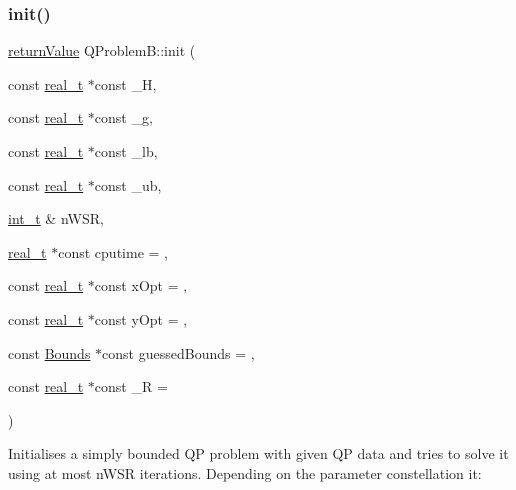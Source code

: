 \subsubsection{\texorpdfstring{init()}{init()}\hspace{0.1cm}{\footnotesize\ttfamily [2/3]}}
{\footnotesize\ttfamily \hyperlink{_message_handling_8hpp_a81d556f613bfbabd0b1f9488c0fa865e}{return\+Value} Q\+Problem\+B\+::init (\begin{DoxyParamCaption}\item[{const \hyperlink{qp_o_a_s_e_s__wrapper_8h_a0d00e2b3dfadee81331bbb39068570c4}{real\+\_\+t} $\ast$const}]{\+\_\+H,  }\item[{const \hyperlink{qp_o_a_s_e_s__wrapper_8h_a0d00e2b3dfadee81331bbb39068570c4}{real\+\_\+t} $\ast$const}]{\+\_\+g,  }\item[{const \hyperlink{qp_o_a_s_e_s__wrapper_8h_a0d00e2b3dfadee81331bbb39068570c4}{real\+\_\+t} $\ast$const}]{\+\_\+lb,  }\item[{const \hyperlink{qp_o_a_s_e_s__wrapper_8h_a0d00e2b3dfadee81331bbb39068570c4}{real\+\_\+t} $\ast$const}]{\+\_\+ub,  }\item[{\hyperlink{_types_8hpp_ab6fd6105e64ed14a0c9281326f05e623}{int\+\_\+t} \&}]{n\+W\+SR,  }\item[{\hyperlink{qp_o_a_s_e_s__wrapper_8h_a0d00e2b3dfadee81331bbb39068570c4}{real\+\_\+t} $\ast$const}]{cputime = {},  }\item[{const \hyperlink{qp_o_a_s_e_s__wrapper_8h_a0d00e2b3dfadee81331bbb39068570c4}{real\+\_\+t} $\ast$const}]{x\+Opt = {},  }\item[{const \hyperlink{qp_o_a_s_e_s__wrapper_8h_a0d00e2b3dfadee81331bbb39068570c4}{real\+\_\+t} $\ast$const}]{y\+Opt = {},  }\item[{const \hyperlink{class_bounds}{Bounds} $\ast$const}]{guessed\+Bounds = {},  }\item[{const \hyperlink{qp_o_a_s_e_s__wrapper_8h_a0d00e2b3dfadee81331bbb39068570c4}{real\+\_\+t} $\ast$const}]{\+\_\+R = {} }\end{DoxyParamCaption})}

Initialises a simply bounded QP problem with given QP data and tries to solve it using at most n\+W\+SR iterations. Depending on the parameter constellation it\+: ~\newline

